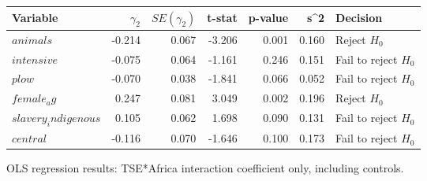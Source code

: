 \centering
\begin{tabular}{lrrrrrl}
\hline
Variable & $\gamma_2$ & $SE(\gamma_2)$ & t-stat & p-value & s^2 & Decision \\
\hline
$animals$ & -0.214 & 0.067 & -3.206 & 0.001 & 0.160 & Reject $H_0$ \\
$intensive$ & -0.075 & 0.064 & -1.161 & 0.246 & 0.151 & Fail to reject $H_0$ \\
$plow$ & -0.070 & 0.038 & -1.841 & 0.066 & 0.052 & Fail to reject $H_0$ \\
$female_ag$ & 0.247 & 0.081 & 3.049 & 0.002 & 0.196 & Reject $H_0$ \\
$slavery_indigenous$ & 0.105 & 0.062 & 1.698 & 0.090 & 0.131 & Fail to reject $H_0$ \\
$central$ & -0.116 & 0.070 & -1.646 & 0.100 & 0.173 & Fail to reject $H_0$ \\
\hline
\end{tabular}
\caption{OLS regression results: TSE*Africa interaction coefficient only, including controls.}
\label{tab:regression_results_TSE_Africa}
